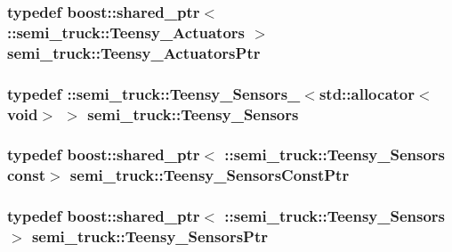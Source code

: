 \subsubsection[{\texorpdfstring{Teensy\+\_\+\+Actuators\+Ptr}{Teensy_ActuatorsPtr}}]{\setlength{\rightskip}{0pt plus 5cm}typedef boost\+::shared\+\_\+ptr$<$ \+::{\bf semi\+\_\+truck\+::\+Teensy\+\_\+\+Actuators} $>$ {\bf semi\+\_\+truck\+::\+Teensy\+\_\+\+Actuators\+Ptr}}\hypertarget{namespacesemi__truck_a865760e0f4929063a89f6acce25f9bab}{}\label{namespacesemi__truck_a865760e0f4929063a89f6acce25f9bab}
\subsubsection[{\texorpdfstring{Teensy\+\_\+\+Sensors}{Teensy_Sensors}}]{\setlength{\rightskip}{0pt plus 5cm}typedef \+::{\bf semi\+\_\+truck\+::\+Teensy\+\_\+\+Sensors\+\_\+}$<$std\+::allocator$<$void$>$ $>$ {\bf semi\+\_\+truck\+::\+Teensy\+\_\+\+Sensors}}\hypertarget{namespacesemi__truck_a8ffe15bf9a1e739c2242ac6d6feaa67f}{}\label{namespacesemi__truck_a8ffe15bf9a1e739c2242ac6d6feaa67f}
\subsubsection[{\texorpdfstring{Teensy\+\_\+\+Sensors\+Const\+Ptr}{Teensy_SensorsConstPtr}}]{\setlength{\rightskip}{0pt plus 5cm}typedef boost\+::shared\+\_\+ptr$<$ \+::{\bf semi\+\_\+truck\+::\+Teensy\+\_\+\+Sensors} const$>$ {\bf semi\+\_\+truck\+::\+Teensy\+\_\+\+Sensors\+Const\+Ptr}}\hypertarget{namespacesemi__truck_a47fa34135a8e2aa8c828d29436a9c726}{}\label{namespacesemi__truck_a47fa34135a8e2aa8c828d29436a9c726}
\subsubsection[{\texorpdfstring{Teensy\+\_\+\+Sensors\+Ptr}{Teensy_SensorsPtr}}]{\setlength{\rightskip}{0pt plus 5cm}typedef boost\+::shared\+\_\+ptr$<$ \+::{\bf semi\+\_\+truck\+::\+Teensy\+\_\+\+Sensors} $>$ {\bf semi\+\_\+truck\+::\+Teensy\+\_\+\+Sensors\+Ptr}}\hypertarget{namespacesemi__truck_a2e84194604862e88522a06e29cff3b7e}{}\label{namespacesemi__truck_a2e84194604862e88522a06e29cff3b7e}



